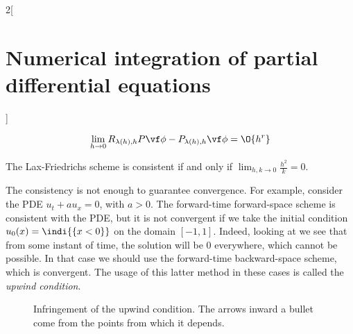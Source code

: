 \documentclass[../../../main_math.tex]{subfiles}
\begin{document}
\begin{multicols}{2}[\section{Numerical integration of partial differential equations}]
\begin{definition}
    $$\lim_{h\to 0}R_{\lambda(h),h}P\vf\phi-P_{\lambda(h),h}\vf\phi=\O{h^r}$$
  \end{definition}
  \begin{lemma}
    The Lax-Friedrichs scheme is consistent if and only if $\displaystyle\lim_{h,k\to 0}\frac{h^2}{k}=0$.
  \end{lemma}
  \begin{remark}
    The consistency is not enough to guarantee convergence. For example, consider the PDE $u_t+au_x=0$, with $a>0$. The forward-time forward-space scheme is consistent with the PDE, but it is not convergent if we take the initial condition $u_0(x)=\indi{\{x<0\}}$ on the domain $[-1,1]$. Indeed, looking at  we see that from some instant of time, the solution will be $0$ everywhere, which cannot be possible. In that case we should use the forward-time backward-space scheme, which is convergent. The usage of this latter method in these cases is called the \emph{upwind condition}.
  \end{remark}
  \begin{figure}[H]
    \centering
    
    \caption{Infringement of the upwind condition. The arrows inward a bullet come from the points from which it depends.}
    \label{NIPDE:upwind}
  \end{figure}

\end{multicols}
\end{document}
